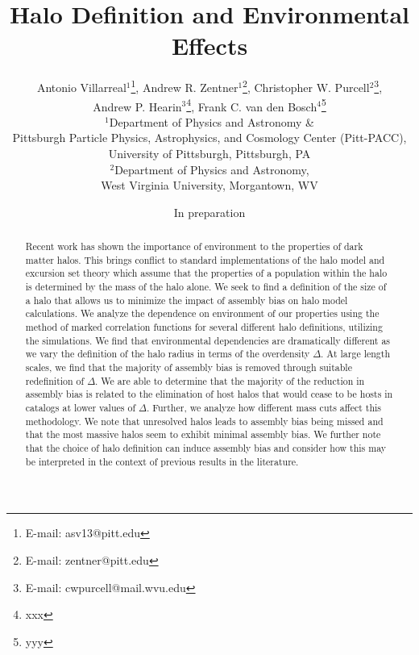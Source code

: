 \documentclass[usenatbib,usegraphicx,letterpaper]{mn2e}
\begin{document}
\title[Halo Definition and Environmental Effects]{Halo Definition and Environmental Effects}
\author[Villareal et al.]
{Antonio Villarreal$^1$\thanks{E-mail: asv13@pitt.edu},
Andrew R. Zentner$^1$\thanks{E-mail: zentner@pitt.edu}, 
Christopher W. Purcell$^2$\thanks{E-mail: cwpurcell@mail.wvu.edu},\\
 Andrew P. Hearin$^3$\thanks{xxx},
 Frank C. van den Bosch$^4$\thanks{yyy}\\
$^{1}$Department of Physics and Astronomy \& \\
Pittsburgh Particle Physics, Astrophysics, and Cosmology Center (Pitt-PACC),\\ 
University of Pittsburgh, Pittsburgh, PA\\
$^{2}$Department of Physics and Astronomy, \\
West Virginia University, Morgantown, WV}

\date{In preparation}



\maketitle

\begin{abstract}
Recent work has shown the importance of environment to the properties of dark matter halos. This brings conflict to standard implementations of the halo model and excursion set theory which assume that the properties of a population within the halo is determined by the mass of the halo alone. We seek to find a definition of the size of a halo that allows us to minimize the impact of assembly bias on halo model calculations. We analyze the dependence on environment of our properties using the method of marked correlation functions for several different halo definitions, utilizing the \citet{diemer15} simulations. We find that environmental dependencies are dramatically different as we vary the definition of the halo radius in terms of the overdensity $\Delta$. At large length scales, we find that the majority of assembly bias is removed through suitable redefinition of $\Delta$. We are able to determine that the majority of the reduction in assembly bias is related to the elimination of host halos that would cease to be hosts in catalogs at lower values of $\Delta$. Further, we analyze how different mass cuts affect this methodology. We note that unresolved halos leads to assembly bias being missed and that the most massive halos seem to exhibit minimal assembly bias. We further note that the choice of halo definition can induce assembly bias and consider how this may be interpreted in the context of previous results in the literature.
\end{abstract}
\end{document}
